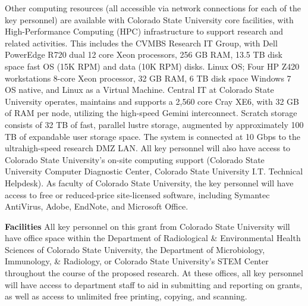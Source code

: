 \documentclass[pdftex,english,11.5pt,parskip=half]{scrartcl}
\begin{document}
Other computing resources (all accessible via network connections for each
of the key personnel) are available with Colorado State University core facilities, with
High-Performance Computing (HPC) infrastructure to support research and
related activities. This includes the CVMBS Research IT Group, with Dell
PowerEdge R720 dual 12 core Xeon processors, 256 GB RAM, 13.5 TB disk space
fast OS (15K RPM) and data (10K RPM) disks.  Linux OS; Four HP Z420
workstations 8-core Xeon
processor, 32 GB RAM, 6 TB disk space Windows 7 OS native, and Linux as a
Virtual Machine.  Central IT at Colorado State University operates, maintains and supports a 2,560 core Cray XE6, with 32 GB of RAM per node, utilizing the high-speed Gemini interconnect. Scratch storage consists of 32 TB of fast, parallel lustre storage, augmented by approximately 100 TB of expandable user storage space. The system is connected at 10 Gbps to the ultrahigh-speed research DMZ LAN. All key personnel will also have access to Colorado State University’s on-site computing support (Colorado State University Computer Diagnostic Center, Colorado State University I.T. Technical Helpdesk). As faculty of Colorado State University, the key personnel will have access to free or reduced-price site-licensed software, including Symantec AntiVirus, Adobe, EndNote, and Microsoft Office.


\textbf{Facilities} All key personnel on this grant from Colorado State University will have office space within the Department of Radiological \& Environmental Health Sciences of Colorado State University, the Department of Microbiology, Immunology, \& Radiology, or Colorado State University's STEM Center throughout the course of the proposed research. At these offices, all key personnel will have access to department staff to aid in submitting and reporting on grants, as well as access to unlimited free printing, copying, and scanning.
\end{document}
